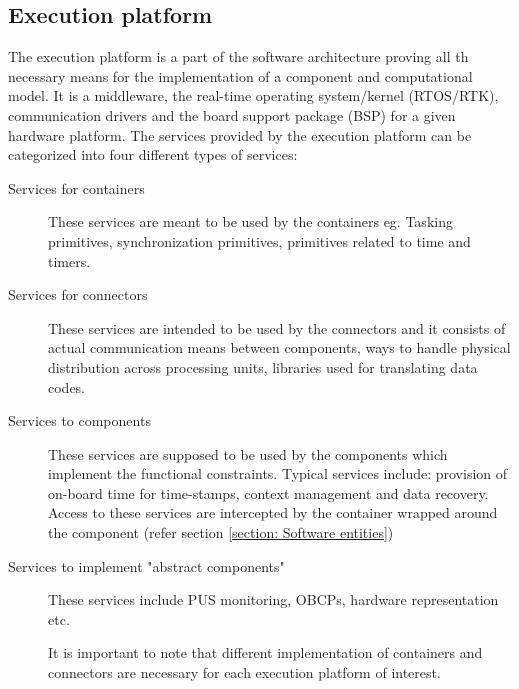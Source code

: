 \subsection{Execution platform}
\label{section: Execution platform}
The execution platform is a part of the software architecture proving all th necessary means for the implementation of a component and computational model. It is a middleware, the real-time operating system/kernel (RTOS/RTK), communication drivers and the board support package (BSP) for a given hardware platform. The services provided by the execution platform can be categorized into four different types of services:
\begin{description}
\item [Services for containers] These services are meant to be used by the containers eg. Tasking primitives, synchronization primitives, primitives related to time and timers.

\item [Services for connectors] These services are intended to be used by the connectors and it consists of actual communication means between components, ways to handle physical distribution across processing units, libraries used for translating data codes.

\item [Services to components] These services are supposed to be used by the components which implement the functional constraints. Typical services include: provision of on-board time for time-stamps, context management and data recovery. Access to these services are intercepted by the container wrapped around the component (refer section \cref{section: Software entities})

\item [Services to implement "abstract components"] These services include PUS monitoring, OBCPs, hardware representation etc.

It is important to note that different implementation of containers and connectors are necessary for each execution platform of interest.  
\end{description} 

